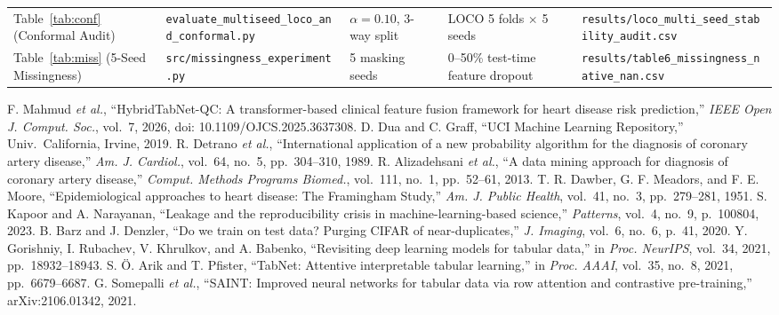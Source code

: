 \documentclass[conference]{IEEEtran}
\begin{document}
\begin{table}[t]
{\begin{tabular}{lllll}
Table~\ref{tab:conf} (Conformal Audit) & \texttt{evaluate\_multiseed\_loco\_and\_conformal.py} & $\alpha=0.10$, 3-way split & LOCO 5 folds $\times$ 5 seeds & \texttt{results/loco\_multi\_seed\_stability\_audit.csv}\\
Table~\ref{tab:miss} (5-Seed Missingness) & \texttt{src/missingness\_experiment.py} & 5 masking seeds & 0--50\% test-time feature dropout & \texttt{results/table6\_missingness\_native\_nan.csv}\\
\bottomrule
\end{tabular}}
\end{table}

\begin{thebibliography}{99}
 F. Mahmud \emph{et al.}, ``HybridTabNet-QC: A transformer-based clinical feature fusion framework for heart disease risk prediction,'' \emph{IEEE Open J. Comput. Soc.}, vol.~7, 2026, doi: 10.1109/OJCS.2025.3637308.
 D. Dua and C. Graff, ``UCI Machine Learning Repository,'' Univ.\ California, Irvine, 2019.
 R. Detrano \emph{et al.}, ``International application of a new probability algorithm for the diagnosis of coronary artery disease,'' \emph{Am. J. Cardiol.}, vol.~64, no.~5, pp.~304--310, 1989.
 R. Alizadehsani \emph{et al.}, ``A data mining approach for diagnosis of coronary artery disease,'' \emph{Comput. Methods Programs Biomed.}, vol.~111, no.~1, pp.~52--61, 2013.
 T. R. Dawber, G. F. Meadors, and F. E. Moore, ``Epidemiological approaches to heart disease: The Framingham Study,'' \emph{Am. J. Public Health}, vol.~41, no.~3, pp.~279--281, 1951.
 S. Kapoor and A. Narayanan, ``Leakage and the reproducibility crisis in machine-learning-based science,'' \emph{Patterns}, vol.~4, no.~9, p.~100804, 2023.
 B. Barz and J. Denzler, ``Do we train on test data? Purging CIFAR of near-duplicates,'' \emph{J. Imaging}, vol.~6, no.~6, p.~41, 2020.
 Y. Gorishniy, I. Rubachev, V. Khrulkov, and A. Babenko, ``Revisiting deep learning models for tabular data,'' in \emph{Proc. NeurIPS}, vol.~34, 2021, pp.~18932--18943.
 S. {\"O}. Arik and T. Pfister, ``TabNet: Attentive interpretable tabular learning,'' in \emph{Proc. AAAI}, vol.~35, no.~8, 2021, pp.~6679--6687.
 G. Somepalli \emph{et al.}, ``SAINT: Improved neural networks for tabular data via row attention and contrastive pre-training,'' arXiv:2106.01342, 2021.

\end{thebibliography}
\end{document}
